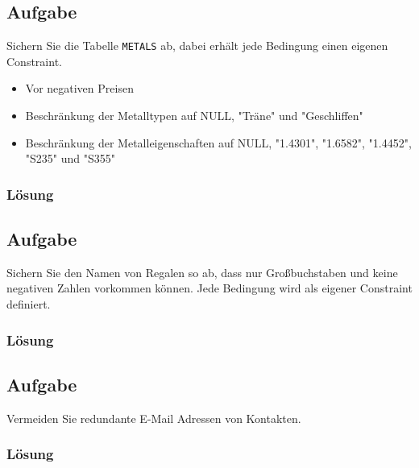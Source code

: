 \subsection{Aufgabe}
\label{sec:uebung_05.aufgabe_04}
Sichern Sie die Tabelle \texttt{METALS} ab, dabei erhält jede Bedingung einen eigenen Constraint.
\begin{itemize}
  \item Vor negativen Preisen
  \item Beschränkung der Metalltypen auf NULL, "Träne" und "Geschliffen"
  \item Beschränkung der Metalleigenschaften auf NULL, "1.4301", "1.6582", "1.4452", "S235" und "S355"
\end{itemize}

\subsubsection*{Lösung}
\label{sec:uebung_05.aufgabe_04.loesung}

\subsection{Aufgabe}
\label{sec:uebung_05.aufgabe_05}
Sichern Sie den Namen von Regalen so ab, dass nur Großbuchstaben und keine negativen Zahlen vorkommen können. Jede Bedingung wird als eigener Constraint definiert.

\subsubsection*{Lösung}
\label{sec:uebung_05.aufgabe_05.loesung}

\subsection{Aufgabe}
\label{sec:uebung_05.aufgabe_06}
Vermeiden Sie redundante E-Mail Adressen von Kontakten.

\subsubsection*{Lösung}
\label{sec:uebung_05.aufgabe_06.loesung}


